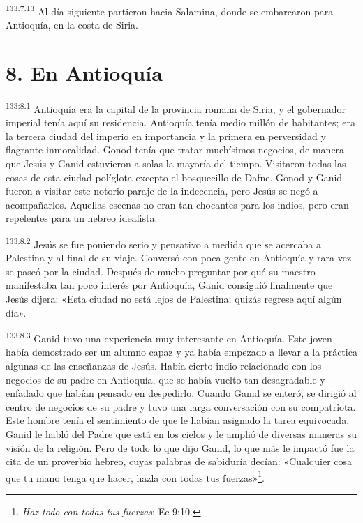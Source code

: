 \par 
\textsuperscript{133:7.13} Al día siguiente partieron hacia Salamina, donde se embarcaron para Antioquía, en la costa de Siria.

\section*{8. En Antioquía}
\par 
\textsuperscript{133:8.1} Antioquía era la capital de la provincia romana de Siria, y el gobernador imperial tenía aquí su residencia. Antioquía tenía medio millón de habitantes; era la tercera ciudad del imperio en importancia y la primera en perversidad y flagrante inmoralidad. Gonod tenía que tratar muchísimos negocios, de manera que Jesús y Ganid estuvieron a solas la mayoría del tiempo. Visitaron todas las cosas de esta ciudad políglota excepto el bosquecillo de Dafne. Gonod y Ganid fueron a visitar este notorio paraje de la indecencia, pero Jesús se negó a acompañarlos. Aquellas escenas no eran tan chocantes para los indios, pero eran repelentes para un hebreo idealista.

\par 
\textsuperscript{133:8.2} Jesús se fue poniendo serio y pensativo a medida que se acercaba a Palestina y al final de su viaje. Conversó con poca gente en Antioquía y rara vez se paseó por la ciudad. Después de mucho preguntar por qué su maestro manifestaba tan poco interés por Antioquía, Ganid consiguió finalmente que Jesús dijera: «Esta ciudad no está lejos de Palestina; quizás regrese aquí algún día».

\par 
\textsuperscript{133:8.3} Ganid tuvo una experiencia muy interesante en Antioquía. Este joven había demostrado ser un alumno capaz y ya había empezado a llevar a la práctica algunas de las enseñanzas de Jesús. Había cierto indio relacionado con los negocios de su padre en Antioquía, que se había vuelto tan desagradable y enfadado que habían pensado en despedirlo. Cuando Ganid se enteró, se dirigió al centro de negocios de su padre y tuvo una larga conversación con su compatriota. Este hombre tenía el sentimiento de que le habían asignado la tarea equivocada. Ganid le habló del Padre que está en los cielos y le amplió de diversas maneras su visión de la religión. Pero de todo lo que dijo Ganid, lo que más le impactó fue la cita de un proverbio hebreo, cuyas palabras de sabiduría decían: «Cualquier cosa que tu mano tenga que hacer, hazla con todas tus fuerzas»\footnote{\textit{Haz todo con todas tus fuerzas}: Ec 9:10.}.


